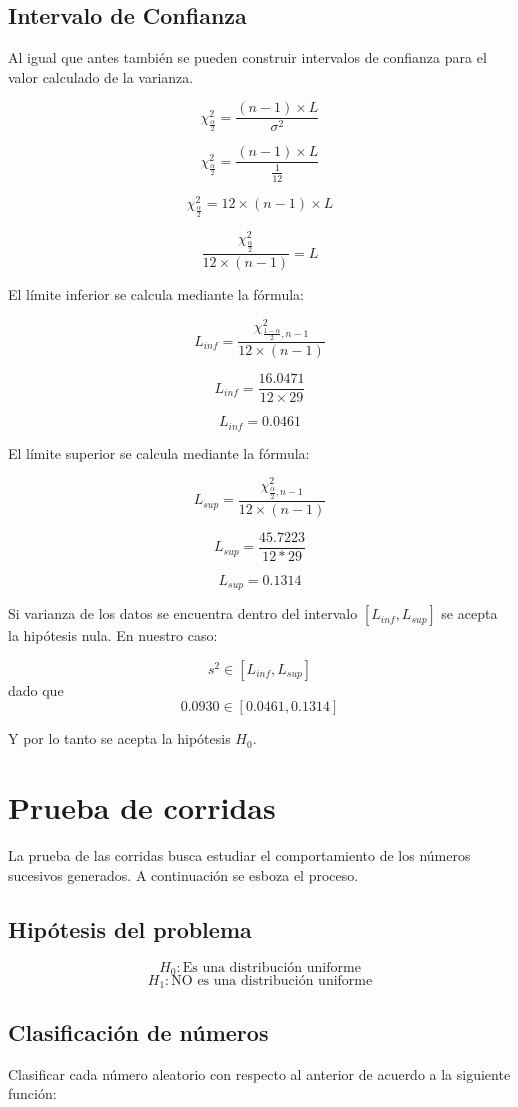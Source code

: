 \subsection{Intervalo de Confianza}

Al igual que antes también se pueden construir intervalos de confianza para el valor calculado de la varianza.

$$\chi^2_{\frac{\alpha}{2}} = \frac{(n-1)\times L}{\sigma^2}$$

$$\chi^2_{\frac{\alpha}{2}} = \frac{(n-1)\times L}{\frac{1}{12}}$$

$$\chi^2_{\frac{\alpha}{2}} = 12 \times (n-1) \times L$$

$$\frac{\chi^2_{\frac{\alpha}{2}}}{12 \times (n-1)} =  L$$

El límite inferior se calcula mediante la fórmula:

$$L_{inf} = \frac{\chi^2_{\frac{1-\alpha}{2}, n-1}}{12 \times (n-1)}$$

$$L_{inf} = \frac{16.0471}{12\times 29}$$

$$L_{inf} = 0.0461$$

El límite superior se calcula mediante la fórmula:

$$L_{sup} = \frac{\chi^2_{\frac{\alpha}{2}, n-1}}{12 \times (n-1)}$$

$$L_{sup} = \frac{45.7223}{12*29}$$

$$L_{sup} = 0.1314$$

Si varianza de los datos se encuentra dentro del intervalo $[L_{inf}, L_{sup}]$ se acepta la hipótesis nula. En nuestro caso:

$$s^2 \in [L_{inf}, L_{sup}]$$ dado que
$$0.0930 \in [0.0461 , 0.1314]$$

Y por lo tanto se acepta la hipótesis $H_0$.


\section{Prueba de corridas}
La prueba de las corridas busca estudiar el comportamiento de los números sucesivos generados. A continuación se esboza el proceso.

\subsection{Hipótesis del problema}
$$H_0: \text{Es una distribución uniforme}$$
$$H_1: \text{NO es una distribución uniforme}$$

\subsection{Clasificación de números}
Clasificar cada número aleatorio con respecto al anterior de acuerdo a la siguiente función:

